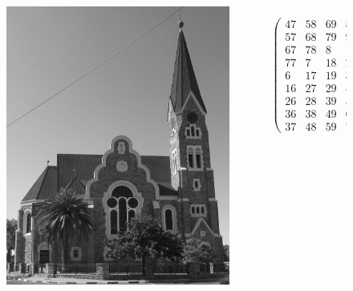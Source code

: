 \documentclass{beamer}
\begin{document}
\begin{frame}
\begin{figure}
    \begin{columns}
	\begin{column}{0.45\textwidth}
		\begin{center}
		\includegraphics[width=0.9\textwidth]{../testimage.jpg}
		\end{center}
	\end{column}
	\begin{column}{0.55\textwidth}
		\scriptsize{
		\begin{equation*}
		\begin{pmatrix}
		47 & 58 & 69 & 80 & 1 & 12 & 23 & 34 & 45 \\
    	57 & 68 & 79 & 9 & 11 & 22 & 33 & 44 & 46 \\
    	67 & 78 & 8 & 10 & 21 & 32 & 43 & 54 & 56 \\
    	77 & 7 & 18 & 20 & 31 & 42 & 53 & 55 & 66 \\
    	6 & 17 & 19 & 30 & 41 & 52 & 63 & 65 & 76 \\
    	16 & 27 & 29 & 40 & 51 & 62 & 64 & 75 & 5 \\
    	26 & 28 & 39 & 50 & 61 & 72 & 74 & 4 & 15 \\
    	36 & 38 & 49 & 60 & 71 & 73 & 3 & 14 & 25 \\
    	37 & 48 & 59 & 70 & 81 & 2 & 13 & 24 & 35
		\end{pmatrix}
		\end{equation*}
		}
	\end{column}
	\end{columns}
\end{figure}
\end{frame}
\end{document}
